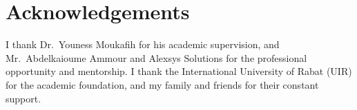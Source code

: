 \chapter*{Acknowledgements}
I thank Dr.\ Youness Moukafih for his academic supervision, and Mr.\ Abdelkaioume Ammour and Alexsys Solutions for the professional opportunity and mentorship. I thank the International University of Rabat (UIR) for the academic foundation, and my family and friends for their constant support.
